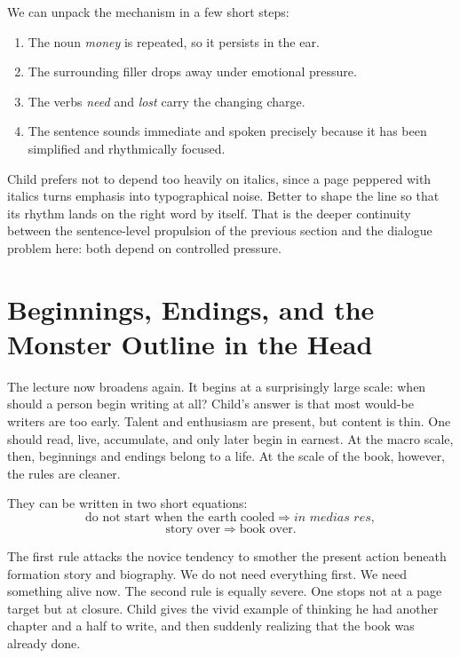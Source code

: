 We can unpack the mechanism in a few short steps:
\begin{enumerate}
\item The noun \emph{money} is repeated, so it persists in the ear.
\item The surrounding filler drops away under emotional pressure.
\item The verbs \emph{need} and \emph{lost} carry the changing charge.
\item The sentence sounds immediate and spoken precisely because it has been simplified and rhythmically focused.
\end{enumerate}

Child prefers not to depend too heavily on italics, since a page peppered with italics turns emphasis into typographical noise. Better to shape the line so that its rhythm lands on the right word by itself. That is the deeper continuity between the sentence-level propulsion of the previous section and the dialogue problem here: both depend on controlled pressure.

\section{Beginnings, Endings, and the Monster Outline in the Head}

The lecture now broadens again. It begins at a surprisingly large scale: when should a person begin writing at all? Child's answer is that most would-be writers are too early. Talent and enthusiasm are present, but content is thin. One should read, live, accumulate, and only later begin in earnest. At the macro scale, then, beginnings and endings belong to a life. At the scale of the book, however, the rules are cleaner.

They can be written in two short equations:
\begin{equation}
\text{do not start when the earth cooled} \Longrightarrow \textit{in medias res},
\end{equation}
\begin{equation}
\text{story over} \Longrightarrow \text{book over}.
\end{equation}

The first rule attacks the novice tendency to smother the present action beneath formation story and biography. We do not need everything first. We need something alive now. The second rule is equally severe. One stops not at a page target but at closure. Child gives the vivid example of thinking he had another chapter and a half to write, and then suddenly realizing that the book was already done.

